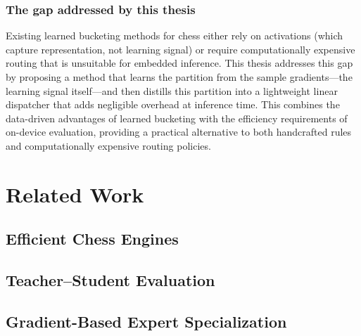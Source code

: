 \subsubsection{The gap addressed by this thesis}\label{sec:gap}

Existing learned bucketing methods for chess either rely on activations (which capture representation, not learning signal) or require computationally expensive routing that is unsuitable for embedded inference. This thesis addresses this gap by proposing a method that learns the partition from the sample gradients---the learning signal itself---and then distills this partition into a lightweight linear dispatcher that adds negligible overhead at inference time. This combines the data-driven advantages of learned bucketing with the efficiency requirements of on-device evaluation, providing a practical alternative to both handcrafted rules and computationally expensive routing policies.

\section{Related Work}\label{sec:related-work}

\subsection{Efficient Chess Engines}\label{sec:rw-efficient}


\subsection{Teacher--Student Evaluation}\label{sec:rw-teacher}


\subsection{Gradient-Based Expert Specialization}\label{sec:rw-grad-experts}

